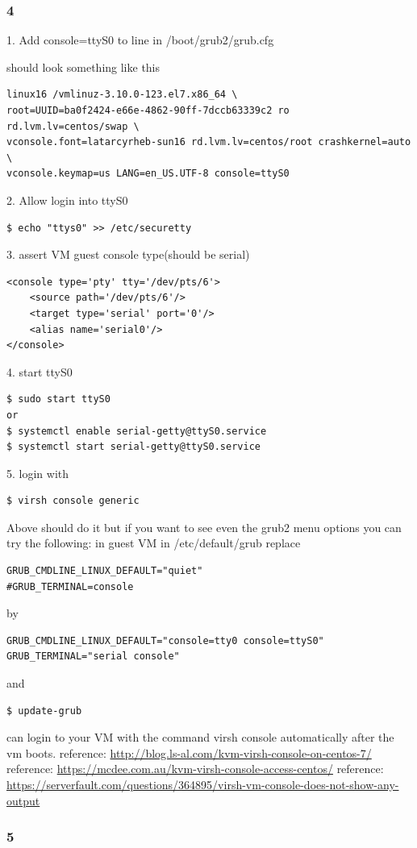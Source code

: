 \documentclass{article}
\begin{document}
    \subsubsection{4}
1. Add console=ttyS0 to line in /boot/grub2/grub.cfg

should look something like this
\begin{verbatim}
linux16 /vmlinuz-3.10.0-123.el7.x86_64 \
root=UUID=ba0f2424-e66e-4862-90ff-7dccb63339c2 ro rd.lvm.lv=centos/swap \
vconsole.font=latarcyrheb-sun16 rd.lvm.lv=centos/root crashkernel=auto  \
vconsole.keymap=us LANG=en_US.UTF-8 console=ttyS0
\end{verbatim}
2. Allow login into ttyS0
\begin{verbatim}
$ echo "ttys0" >> /etc/securetty
\end{verbatim}
3. assert VM guest console type(should be serial)
\begin{verbatim}
<console type='pty' tty='/dev/pts/6'>
    <source path='/dev/pts/6'/>
    <target type='serial' port='0'/>
    <alias name='serial0'/>
</console>
\end{verbatim}
4. start ttyS0
\begin{verbatim}
$ sudo start ttyS0
or
$ systemctl enable serial-getty@ttyS0.service
$ systemctl start serial-getty@ttyS0.service
\end{verbatim}
5. login with
\begin{verbatim}
$ virsh console generic
\end{verbatim}
Above should do it but if you want to see even the grub2 menu options you can try the following:
in guest VM in /etc/default/grub replace
\begin{verbatim}
GRUB_CMDLINE_LINUX_DEFAULT="quiet"
#GRUB_TERMINAL=console
\end{verbatim}
by
\begin{verbatim}
GRUB_CMDLINE_LINUX_DEFAULT="console=tty0 console=ttyS0"
GRUB_TERMINAL="serial console"
\end{verbatim}
and
\begin{verbatim}
$ update-grub
\end{verbatim}
can login to your VM with the command virsh console
automatically after the vm boots.
reference: \url{http://blog.ls-al.com/kvm-virsh-console-on-centos-7/}\newline
reference: \url{https://mcdee.com.au/kvm-virsh-console-access-centos/}\newline
reference: \url{https://serverfault.com/questions/364895/virsh-vm-console-does-not-show-any-output}
    \subsubsection{5}
\end{document}
